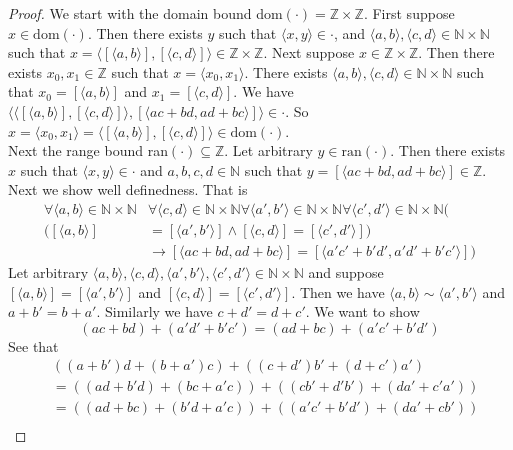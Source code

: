 \documentclass{report}
\begin{document}
\begin{proof}
We start with the domain bound dom$(\cdot)=\mathbb Z\times\mathbb Z$. First suppose $x\in\text{dom}(\cdot)$. Then there exists $y$ such that $\langle x,y\rangle\in\cdot$, and 
$\langle a,b\rangle,\langle c,d\rangle\in\mathbb N\times\mathbb N$ such that
$x=\langle[\langle a,b\rangle],[\langle c,d\rangle]\rangle\in\mathbb Z\times\mathbb Z$. Next suppose $x\in\mathbb Z\times\mathbb Z$. Then there exists $x_0,x_1\in\mathbb Z$ such that 
$x=\langle x_0,x_1\rangle$. There exists $\langle a,b\rangle,\langle c,d\rangle\in\mathbb N\times\mathbb N$ such that $x_0=[\langle a,b\rangle]$ and $x_1=[\langle c,d\rangle]$.
We have $\langle\langle[\langle a,b\rangle],[\langle c,d\rangle]\rangle,[\langle ac+bd,ad+bc\rangle]\rangle\in\cdot$.
So $x=\langle x_0,x_1\rangle=\langle[\langle a,b\rangle],[\langle c,d\rangle]\rangle\in\text{dom}(\cdot)$.\\
\indent Next the range bound ran$(\cdot)\subseteq\mathbb Z$. Let arbitrary $y\in\text{ran}(\cdot)$. 
Then there exists $x$ such that $\langle x,y\rangle\in\cdot$ and $a,b,c,d\in\mathbb N$ such that
$y=[\langle ac+bd,ad+bc\rangle]\in\mathbb Z$.\\
\indent Next we show well definedness. That is
\begin{align*}
\forall\langle a,b\rangle\in\mathbb N\times\mathbb N&\forall\langle c,d\rangle\in\mathbb N\times\mathbb N\forall\langle a',b'\rangle\in\mathbb N\times\mathbb N
\forall\langle c',d'\rangle\in\mathbb N\times\mathbb N(\\
([\langle a,b\rangle]&=[\langle a',b'\rangle]\land[\langle c,d\rangle]=[\langle c',d'\rangle])\\&\to
[\langle ac+bd,ad+bc\rangle]=[\langle a'c'+b'd',a'd'+b'c'\rangle])
\end{align*}
Let arbitrary $\langle a,b\rangle,\langle c,d\rangle,\langle a',b'\rangle,\langle c',d'\rangle\in\mathbb N\times\mathbb N$ and suppose  
$[\langle a,b\rangle]=[\langle a',b'\rangle]$ and $[\langle c,d\rangle]=[\langle c',d'\rangle]$.
Then we have $\langle a,b\rangle\sim\langle a',b'\rangle$ and
$a+b'=b+a'$. Similarly we have $c+d'=d+c'$. We want to show
\begin{equation*}
(ac+bd)+(a'd'+b'c')=(ad+bc)+(a'c'+b'd')
\end{equation*}
See that
\begin{align*}
&((a+b')d+(b+a')c)+((c+d')b'+(d+c')a')\\
&=((ad+b'd)+(bc+a'c))+((cb'+d'b')+(da'+c'a'))\\
&=((ad+bc)+(b'd+a'c))+((a'c'+b'd')+(da'+cb'))\\

\end{align*}
\end{proof}
\end{document}
